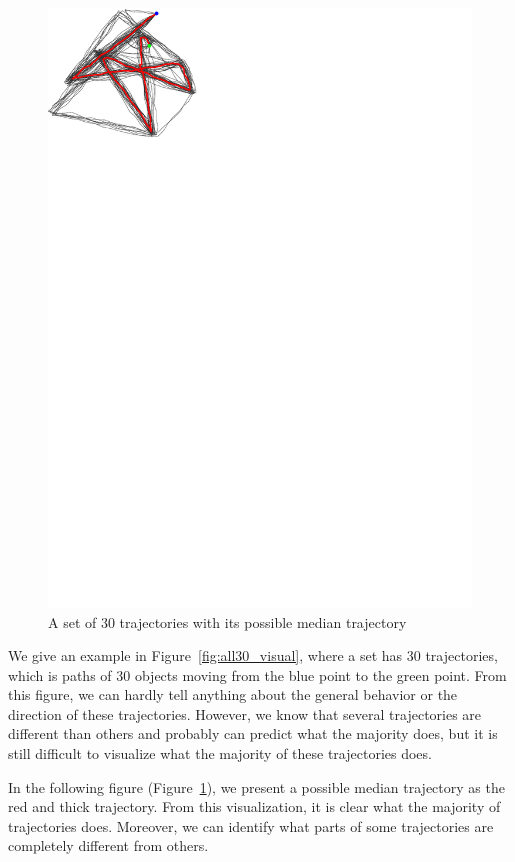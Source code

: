 \begin{figure}
\centering
\includegraphics[scale=1]{Gambar/med_visual}
\caption[A set of 30 trajectories with its possible median trajectory]{A set of 30 trajectories with its possible median trajectory} 
\label{fig:med_visual}
\end{figure}

We give an example in Figure~\ref{fig:all30_visual}, where a set has 30 trajectories, which is paths of 30 objects moving from the blue point to the green point.
From this figure, we can hardly tell anything about the general behavior or the direction of these trajectories. 
However, we know that several trajectories are different than others and probably can predict what the majority does, but it is still difficult to visualize what the majority of these trajectories does.

In the following figure (Figure~\ref{fig:med_visual}), we present a possible median trajectory as the red and thick trajectory.
From this visualization, it is clear what the majority of trajectories does.
Moreover, we can identify what parts of some trajectories are completely different from others. 

